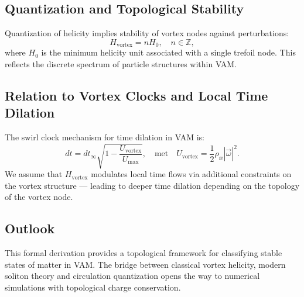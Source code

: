 \subsection{Quantization and Topological Stability}

Quantization of helicity implies stability of vortex nodes against perturbations:
\begin{equation}
    H_{\text{vortex}} = n H_0, \quad n \in \mathbb{Z},
\end{equation}
where $H_0$ is the minimum helicity unit associated with a single trefoil node. This reflects the discrete spectrum of particle structures within VAM.

\subsection{Relation to Vortex Clocks and Local Time Dilation}

The swirl clock mechanism for time dilation in VAM is:
\begin{equation}
    dt = dt_\infty \sqrt{1 - \frac{U_{\text{vortex}}}{U_{\text{max}}}},
    \quad \text{met} \quad
    U_{\text{vortex}} = \frac{1}{2} \rho_\text{\ae} |\vec{\omega}|^2.
\end{equation}
We assume that $H_{\text{vortex}}$ modulates local time flows via additional constraints on the vortex structure — leading to deeper time dilation depending on the topology of the vortex node.

\subsection{Outlook}

This formal derivation provides a topological framework for classifying stable states of matter in VAM. The bridge between classical vortex helicity, modern soliton theory and circulation quantization opens the way to numerical simulations with topological charge conservation.